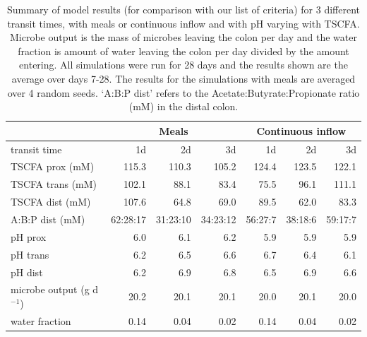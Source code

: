 \documentclass[a4paper]{article}
\begin{document}
\begin{table}[ht]
\caption{Summary of model results (for comparison with our list of criteria) for 3 different transit times, with meals or continuous inflow and with pH varying with TSCFA. Microbe output is the mass of microbes leaving the colon per day and the water fraction is amount of water leaving the colon per day divided by the amount entering. All simulations were run for 28 days and the results shown are the average over days 7-28. The results for the simulations with meals are averaged over 4 random seeds. `A:B:P dist' refers to the Acetate:Butyrate:Propionate ratio (mM) in the distal colon.}
\centering
\small
\begin{tabular}{l|rrr|rrr}
  \hline
  & \multicolumn{3}{c|}{Meals}  & \multicolumn{3}{c}{Continuous  inflow} \\
\hline
transit  time & 1d & 2d & 3d & 1d & 2d & 3d \\ 
  \hline
TSCFA prox  (mM) & 115.3 & 110.3 & 105.2 & 124.4 & 123.5 & 122.1 \\ 
TSCFA trans (mM) & 102.1 & 88.1 & 83.4 & 75.5 & 96.1 & 111.1 \\ 
TSCFA  dist (mM) & 107.6 & 64.8 & 69.0 & 89.5 & 62.0 & 83.3 \\ 
A:B:P dist (mM) & 62:28:17 &31:23:10 & 34:23:12 & 56:27:7 &38:18:6 &59:17:7\\
\hline
pH prox & 6.0& 6.1 & 6.2 & 5.9 & 5.9 & 5.9 \\ 
pH trans & 6.2 & 6.5 & 6.6 & 6.7 & 6.4 & 6.1 \\ 
pH dist & 6.2 & 6.9 & 6.8 & 6.5 & 6.9 & 6.6 \\ 
\hline
microbe  output (g d$^{-1}$) & 20.2 & 20.1 & 20.1 & 20.0 & 20.1 & 20.0 \\ 
water  fraction & 0.14 & 0.04 & 0.02 & 0.14 & 0.04 & 0.02 \\ 
   \hline
\end{tabular}
\label{table:Results}
\end{table}
\end{document}
